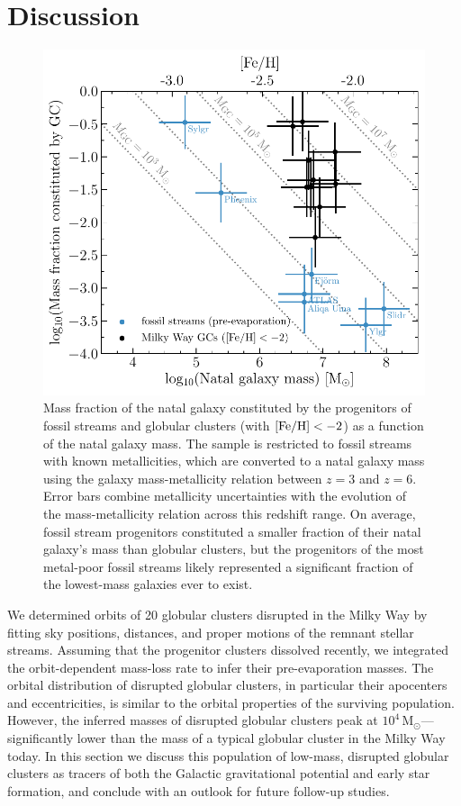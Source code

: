 \documentclass[twocolumn]{aastex63}
\newcommand{\msun}{\ensuremath{\textrm{M}_\odot}}
\begin{document}
\section{Discussion}
\label{sec:discussion}

\begin{figure}
\includegraphics[width=\hsize]{figures/mhost_fraction.pdf}%
\caption{
\label{fig:mhost}
Mass fraction of the natal galaxy constituted by the progenitors of fossil streams and globular clusters (with ${\rm [Fe/H]}<-2$) as a function of the natal galaxy mass. The sample is restricted to fossil streams with known metallicities, which are converted to a natal galaxy mass using the galaxy mass-metallicity relation between $z=3$ and $z=6$. Error bars combine metallicity uncertainties with the evolution of the mass-metallicity relation across this redshift range. On average, fossil stream progenitors constituted a smaller fraction of their natal galaxy's mass than globular clusters, but the progenitors of the most metal-poor fossil streams likely represented a significant fraction of the lowest-mass galaxies ever to exist.}
\end{figure}

We determined orbits of 20 globular clusters disrupted in the Milky Way by fitting sky positions, distances, and proper motions of the remnant stellar streams.
Assuming that the progenitor clusters dissolved recently, we integrated the orbit-dependent mass-loss rate to infer their pre-evaporation masses.
The orbital distribution of disrupted globular clusters, in particular their apocenters and eccentricities, is similar to the orbital properties of the surviving population.
However, the inferred masses of disrupted globular clusters peak at $10^4\,\msun$---significantly lower than the mass of a typical globular cluster in the Milky Way today.
In this section we discuss this population of low-mass, disrupted globular clusters as tracers of both the Galactic gravitational potential and early star formation, and conclude with an outlook for future follow-up studies.
\end{document}
